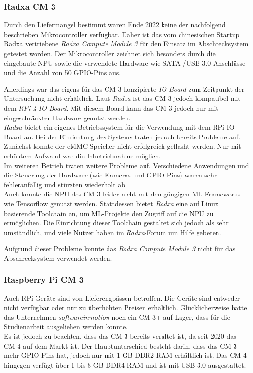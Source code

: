 \subsubsection{Radxa \ac{CM} 3}

Durch den Liefermangel bestimmt waren Ende 2022 keine der nachfolgend beschrieben Mikrocontroller verfügbar. Daher ist das vom chinesischen Startup Radxa vertriebene \textit{Radxa Compute Module 3} für den Einsatz im Abschrecksystem getestet worden. Der Mikrocontroller zeichnet sich besonders durch die eingebaute \ac{NPU} sowie die verwendete Hardware wie \ac{SATA}-/USB 3.0-Anschlüsse und die Anzahl von 50 \ac{GPIO}-Pins aus. \cite{radxa}

Allerdings war das eigens für das \ac{CM} 3 konzipierte \textit{IO Board} zum Zeitpunkt der Untersuchung nicht erhältlich. Laut \textit{Radxa} ist das \ac{CM} 3 jedoch kompatibel mit dem \textit{\acl*{RPi} 4 IO Board}. Mit diesem Board kann das \ac{CM} 3 jedoch nur mit eingeschränkter Hardware genutzt werden.
\\
\textit{Radxa} bietet ein eigenes Betriebssystem für die Verwendung mit dem \ac{RPi} IO Board an. Bei der Einrichtung des Systems traten jedoch bereits Probleme auf. Zunächst konnte der \ac{eMMC}-Speicher nicht erfolgreich geflasht werden. Nur mit erhöhtem Aufwand war die Inbetriebnahme möglich.
\\
Im weiteren Betrieb traten weitere Probleme auf. Verschiedene Anwendungen und die Steuerung der Hardware (wie Kameras und \ac{GPIO}-Pins) waren sehr fehleranfällig und stürzten wiederholt ab.
\\
Auch konnte die \ac{NPU} des \ac{CM} 3 leider nicht mit den gängigen \ac{ML}-Frameworks wie Tensorflow genutzt werden. Stattdessen bietet \textit{Radxa} eine auf Linux basierende Toolchain an, um \ac{ML}-Projekte den Zugriff auf die \ac{NPU} zu ermöglichen. Die Einrichtung dieser Toolchain gestaltet sich jedoch als sehr umständlich, und viele Nutzer haben im \textit{Radxa}-Forum um Hilfe gebeten. \cite{radxa}

Aufgrund dieser Probleme konnte das \textit{Radxa Compute Module 3} nicht für das Abschrecksystem verwendet werden.

\subsubsection{Raspberry Pi \ac{CM} 3}

Auch \ac{RPi}-Geräte sind von Lieferengpässen betroffen. Die Geräte sind entweder nicht verfügbar oder nur zu überhöhten Preisen erhältlich. Glücklicherweise hatte das Unternehmen \textit{softwareinmotion} noch ein \ac{CM} 3+ auf Lager, dass für die Studienarbeit ausgeliehen werden konnte.
\\
Es ist jedoch zu beachten, dass das \ac{CM} 3 bereits veraltet ist, da seit 2020 das \ac{CM} 4 auf dem Markt ist. Der Hauptunterschied besteht darin, dass das \ac{CM} 3 mehr \ac{GPIO}-Pins hat, jedoch nur mit 1 GB DDR2 RAM erhältlich ist. Das \ac{CM} 4 hingegen verfügt über 1 bis 8 GB DDR4 RAM und ist mit USB 3.0 ausgestattet. \cite{cm4_cm3}

